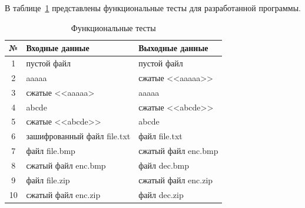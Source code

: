 В таблице~\ref{tbl:functional_test} представлены функциональные тесты для разработанной программы.
\begin{table}[ht!]
	\begin{center}
		\captionsetup{justification=raggedright,singlelinecheck=off}
		\caption{\label{tbl:functional_test} Функциональные тесты}
		\begin{tabularx}{\textwidth}{|c|X|X|}
			\hline
			№ & Входные данные & Выходные данные \\
			\hline
			1 & пустой файл & пустой файл \\
			\hline
			2 & aaaaa & сжатые <<aaaaa>> \\
			\hline
			3 & сжатые <<aaaaa> & aaaaa \\
			\hline
			4 & abcde & сжатые <<abcde>> \\
			\hline
			5 & сжатые <<abcde>> & abcde \\
			\hline
			6 & зашифрованный файл file.txt & файл file.txt \\
			\hline
			7 & файл file.bmp & сжатый файл enc.bmp \\
			\hline
			8 & сжатый файл enc.bmp & файл dec.bmp \\
			\hline
			9 & файл file.zip & сжатый файл enc.zip \\
			\hline
			10 & сжатый файл enc.zip & файл dec.zip \\
			\hline
		\end{tabularx}
	\end{center}
\end{table}